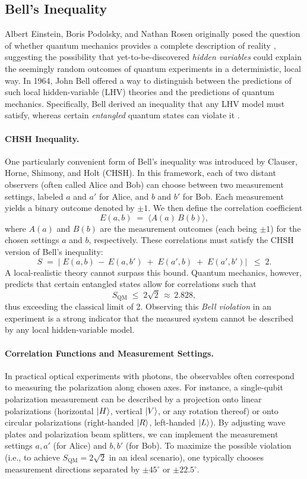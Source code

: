 \subsection{Bell's Inequality}
Albert Einstein, Boris Podolsky, and Nathan Rosen originally posed the question of whether quantum mechanics provides a complete description of reality \cite{EPR}, suggesting the possibility that yet-to-be-discovered \emph{hidden variables} could explain the seemingly random outcomes of quantum experiments in a deterministic, local way. In 1964, John Bell offered a way to distinguish between the predictions of such local hidden-variable (LHV) theories and the predictions of quantum mechanics. Specifically, Bell derived an inequality that any LHV model must satisfy, whereas certain \emph{entangled} quantum states can violate it \cite{bell}. 

\paragraph{CHSH Inequality.}
One particularly convenient form of Bell’s inequality was introduced by Clauser, Horne, Shimony, and Holt (CHSH). In this framework, each of two distant observers (often called Alice and Bob) can choose between two measurement settings, labeled $a$ and $a'$ for Alice, and $b$ and $b'$ for Bob. Each measurement yields a binary outcome denoted by $\pm 1$. We then define the correlation coefficient 
\[
E(a,b) \;=\; \langle A(a) \, B(b) \rangle,
\]
where $A(a)$ and $B(b)$ are the measurement outcomes (each being $\pm1$) for the chosen settings $a$ and $b$, respectively. These correlations must satisfy the CHSH version of Bell's inequality:
\[
S \;=\; \bigl|\;E(a,b) \,-\,E(a,b') \;+\;E(a',b) \;+\;E(a',b')\bigr| \;\;\le\; 2.
\]
A local-realistic theory cannot surpass this bound. Quantum mechanics, however, predicts that certain entangled states allow for correlations such that
\[
S_{\mathrm{QM}} \;\le\; 2\sqrt{2}\,\approx\,2.828,
\]
thus exceeding the classical limit of 2. Observing this \emph{Bell violation} in an experiment is a strong indicator that the measured system cannot be described by any local hidden-variable model.

\paragraph{Correlation Functions and Measurement Settings.}
In practical optical experiments with photons, the observables often correspond to measuring the polarization along chosen axes. For instance, a single-qubit polarization measurement can be described by a projection onto linear polarizations (horizontal $\ket{H}$, vertical $\ket{V}$, or any rotation thereof) or onto circular polarizations (right-handed $\ket{R}$, left-handed $\ket{L}$). By adjusting wave plates and polarization beam splitters, we can implement the measurement settings $a,a'$ (for Alice) and $b,b'$ (for Bob). To maximize the possible violation (i.e., to achieve $S_{\mathrm{QM}}=2\sqrt{2}$ in an ideal scenario), one typically chooses measurement directions separated by $\pm45^\circ$ or $\pm22.5^\circ$. 

